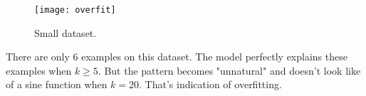 \begin{answer}
\begin{figure}[H]
	\centering
	\texttt{[image: overfit]}
	\caption{Small dataset.}
\end{figure}
There are only 6 examples on this dataset. The model perfectly explains these examples when $k \ge 5$. But the pattern becomes "unnatural" and doesn't look like of a sine function when $k = 20$. That's indication of overfitting.\\
\end{answer}
